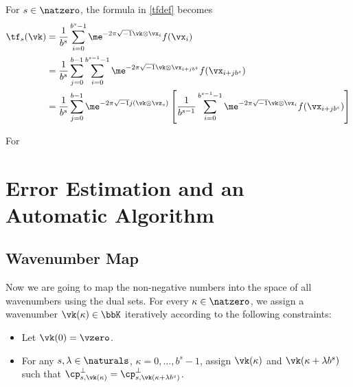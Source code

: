 \documentclass[]{elsarticle}
\begin{document}
For $s \in \natzero$, the formula in \eqref{tfdef} becomes
\begin{align*}
\tf_s(\vk) &= \frac{1}{b^s} \sum_{i=0}^{b^s-1} \me^{-2 \pi \sqrt{-1} \vk \otimes \vx_i} f(\vx_i)\\
&= \frac{1}{b^s} \sum_{j=0}^{b-1} \sum_{i=0}^{b^{s-1}-1} \me^{-2 \pi \sqrt{-1} \vk \otimes \vx_{i+jb^s}} f(\vx_{i+jb^s}) \\
&= \frac{1}{b^s} \sum_{j=0}^{b-1} \me^{-2 \pi \sqrt{-1} j (\vk \otimes \vz_{s})} \left[ \frac{1}{b^{s-1}}\sum_{i=0}^{b^{s-1}-1} \me^{-2 \pi \sqrt{-1} \vk \otimes \vx_{i}} f(\vx_{i+jb^s}) \right] \\
\end{align*}

For 
\section{Error Estimation and an Automatic Algorithm}

\subsection{Wavenumber Map}

Now we are going to map the non-negative numbers into the space of all wavenumbers using the dual sets.  For every $\kappa \in \natzero$, we assign a wavenumber $\vk(\kappa) \in \bbK$ iteratively according to the following constraints: 
\begin{itemize}

\item Let $\vk(0)= \vzero$.

\item For any $s,\lambda \in \naturals$, $\kappa=0, \ldots, b^s-1$, assign $\vk(\kappa)$ and $\vk(\kappa+ \lambda b^s)$ such that $\cp^{\perp}_{s,\vk(\kappa)}=\cp^{\perp}_{s,\vk(\kappa+ \lambda b^s)}$.
\end{itemize}
\end{document}
